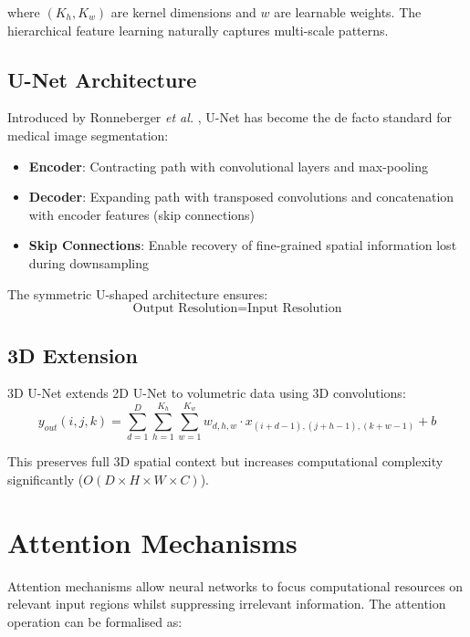 \documentclass{ecsproject}     %
\begin{document}
where $(K_h, K_w)$ are kernel dimensions and $w$ are learnable weights. The hierarchical feature learning naturally captures multi-scale patterns.

\subsection{U-Net Architecture}

Introduced by Ronneberger \textit{et al.} \cite{Ronneberger2015}, U-Net has become the de facto standard for medical image segmentation:

\begin{itemize}
    \item \textbf{Encoder}: Contracting path with convolutional layers and max-pooling
    \item \textbf{Decoder}: Expanding path with transposed convolutions and concatenation with encoder features (skip connections)
    \item \textbf{Skip Connections}: Enable recovery of fine-grained spatial information lost during downsampling
\end{itemize}

The symmetric U-shaped architecture ensures:
\begin{equation}
\text{Output Resolution} = \text{Input Resolution}
\end{equation}

\subsection{3D Extension}

3D U-Net \cite{Cicek2016} extends 2D U-Net to volumetric data using 3D convolutions:
\begin{equation}
y_{out}(i,j,k) = \sum_{d=1}^{D} \sum_{h=1}^{K_h} \sum_{w=1}^{K_w} w_{d,h,w} \cdot x_{(i+d-1), (j+h-1), (k+w-1)} + b
\end{equation}

This preserves full 3D spatial context but increases computational complexity significantly ($O(D \times H \times W \times C)$).

\section{Attention Mechanisms}

Attention mechanisms allow neural networks to focus computational resources on relevant input regions whilst suppressing irrelevant information. The attention operation can be formalised as:
\end{document}
